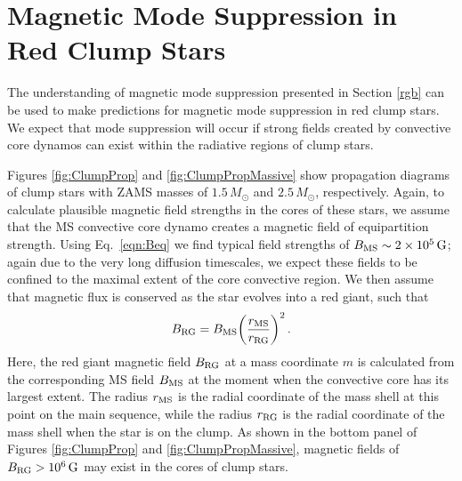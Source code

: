 \section{Magnetic Mode Suppression in Red Clump Stars}
\label{clump}

The understanding of magnetic mode suppression presented in Section \ref{rgb} can be used to make predictions for magnetic mode suppression in red clump stars. We expect that mode suppression will occur if strong fields created by convective core dynamos can exist within the radiative regions of clump stars. 


Figures \ref{fig:ClumpProp} and \ref{fig:ClumpPropMassive} show propagation diagrams of clump stars with ZAMS masses of $1.5 \, M_\odot$ and $2.5 \, M_\odot$, respectively. 
Again, to calculate plausible magnetic field strengths in the cores of these stars, we assume that the MS convective core dynamo creates a magnetic field of equipartition strength.
Using Eq.~\ref{eqn:Beq} we find typical field strengths of $B_{\rm MS} \sim 2 \times 10^5 \, {\rm G}$; again due to the very long diffusion timescales, we expect these fields to be confined to the maximal extent of the core convective region. We then assume that magnetic flux is conserved as the star evolves into a red giant, such that
\begin{equation}
\label{eqn:Brgb}
B_{\rm RG} = B_{\rm MS} \bigg( \frac{r_{\rm MS}}{r_{\rm RG}} \bigg)^2 \, .
\end{equation}
Here, the red giant magnetic field $B_{\rm RG}$ at a mass coordinate $m$ is calculated from the corresponding MS field $B_{\rm MS}$ at the moment when the convective core has its largest extent. The radius $r_{\rm MS}$ is the radial coordinate of the mass shell at this point on the main sequence, while the radius $r_{\rm RG}$ is the radial coordinate of the mass shell when the star is on the clump. As shown in the bottom panel of Figures \ref{fig:ClumpProp} and \ref{fig:ClumpPropMassive}, magnetic fields of $B_{\rm RG} > 10^6 \, {\rm G}$ may exist in the cores of clump stars. 


